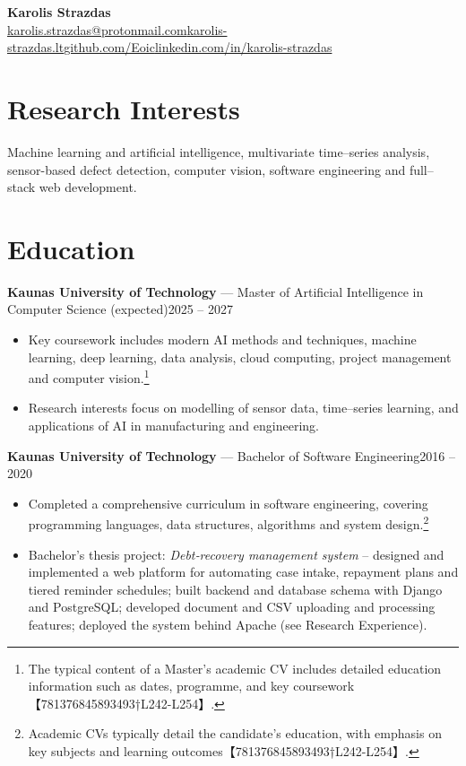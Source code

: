 \documentclass[10pt,a4paper]{article}
\makeatletter
\newcommand{\entry}[3]{\noindent\textbf{#1} — #2\hfill #3\\}
\newcommand{\Name}{Karolis Strazdas}
\newcommand{\Email}{karolis.strazdas@protonmail.com}
\newcommand{\Website}{https://karolis-strazdas.lt}
\newcommand{\GitHub}{https://github.com/Eoic}
\newcommand{\LinkedIn}{https://www.linkedin.com/in/karolis-strazdas/}
\makeatother
\begin{document}
\pagestyle{empty}

\begin{center}
{\Huge\bfseries \Name}\\[0.8em]
{\small \href{mailto:\Email}{\Email}\quad\textbullet\quad \href{\Website}{karolis-strazdas.lt}\quad\textbullet\quad \href{\GitHub}{github.com/Eoic}\quad\textbullet\quad \href{\LinkedIn}{linkedin.com/in/karolis-strazdas}}
\end{center}

\vspace{-0.7em}

\begingroup\small

\section*{Research Interests}
Machine learning and artificial intelligence, multivariate time--series analysis, sensor-based defect detection, computer vision, software engineering and full–stack web development.

\section*{Education}
\entry{Kaunas University of Technology}{Master of Artificial Intelligence in Computer Science (expected)}{2025 -- 2027}
\begin{itemize}[leftmargin=*, topsep=0em]
  \item Key coursework includes modern AI methods and techniques, machine learning, deep learning, data analysis, cloud computing, project management and computer vision.\footnote{The typical content of a Master’s academic CV includes detailed education information such as dates, programme, and key coursework【781376845893493†L242-L254】.}
  \item Research interests focus on modelling of sensor data, time–series learning, and applications of AI in manufacturing and engineering.
\end{itemize}

\entry{Kaunas University of Technology}{Bachelor of Software Engineering}{2016 -- 2020}
\begin{itemize}[leftmargin=*, topsep=0em]
  \item Completed a comprehensive curriculum in software engineering, covering programming languages, data structures, algorithms and system design.\footnote{Academic CVs typically detail the candidate’s education, with emphasis on key subjects and learning outcomes【781376845893493†L242-L254】.}
  \item Bachelor’s thesis project: \emph{Debt‑recovery management system} – designed and implemented a web platform for automating case intake, repayment plans and tiered reminder schedules; built backend and database schema with Django and PostgreSQL; developed document and CSV uploading and processing features; deployed the system behind Apache (see Research Experience).
\end{itemize}
\end{document}
